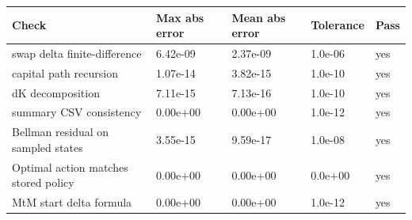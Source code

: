 \begin{tabular}{lllll}
\toprule
Check & Max abs error & Mean abs error & Tolerance & Pass \\
\midrule
swap delta finite-difference & 6.42e-09 & 2.37e-09 & 1.0e-06 & yes \\
capital path recursion & 1.07e-14 & 3.82e-15 & 1.0e-10 & yes \\
dK decomposition & 7.11e-15 & 7.13e-16 & 1.0e-10 & yes \\
summary CSV consistency & 0.00e+00 & 0.00e+00 & 1.0e-12 & yes \\
Bellman residual on sampled states & 3.55e-15 & 9.59e-17 & 1.0e-08 & yes \\
Optimal action matches stored policy & 0.00e+00 & 0.00e+00 & 0.0e+00 & yes \\
MtM start delta formula & 0.00e+00 & 0.00e+00 & 1.0e-12 & yes \\
\bottomrule
\end{tabular}
